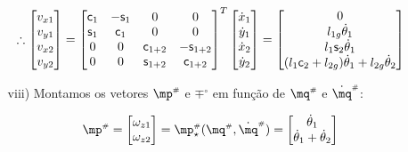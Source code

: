 \begin{itemize}
\begin{itemize}
	
	\begin{equation}
	\therefore
	\begin{bmatrix}
	v_{x1} \\
	v_{y1} \\
	v_{x2} \\
	v_{y2} \\
	\end{bmatrix}
	=
	\begin{bmatrix}
	\mathsf{c}_1 & -\mathsf{s}_1 & 0 & 0 \\
	\mathsf{s}_1 & \mathsf{c}_1 & 0 & 0 \\
	0 & 0 & \mathsf{c}_{1+2} & -\mathsf{s}_{1+2} \\
	0 & 0 & \mathsf{s}_{1+2} & \mathsf{c}_{1+2} \\
	\end{bmatrix}^T
	\begin{bmatrix}
	\dot{x}_1 \\
	\dot{y}_1 \\	
	\dot{x}_2 \\
	\dot{y}_2 \\	
	\end{bmatrix}
	=
	\begin{bmatrix}
	0 \\
	l_{1g} \dot{\theta}_1 \\
	l_1 \mathsf{s}_2 \dot{\theta}_1\\
	(l_1 \mathsf{c}_2 + l_{2g} )\dot{\theta}_1 + l_{2g} \dot{\theta}_2 \\
	\end{bmatrix}
	\end{equation}
	
	\item[viii)] Montamos os vetores $\mp\ssh$ e $\mp^\circ$ em fun\c{c}\~ao de $\mq\ssh$ e $\dot{\mq}\ssh$:

	\begin{equation}
	\mp\ssh = 
	\begin{bmatrix}
	\omega_{z1} \\
	\omega_{z2} \\
	\end{bmatrix}
	= \mp\ssh_\star (\mq\ssh, \dot{\mq}\ssh ) =
	\begin{bmatrix}
	\dot{\theta}_1 \\
	\dot{\theta}_1 +\dot{\theta}_2 \\
	\end{bmatrix}
	\end{equation}
	

\end{itemize}
\end{itemize}
